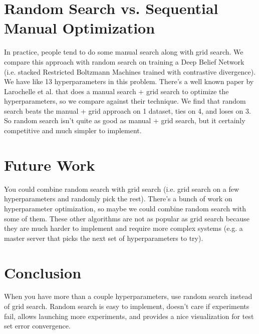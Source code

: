 \documentclass[a4paper]{article}
\begin{document}
\section{Random Search vs. Sequential Manual Optimization}
In practice, people tend to do some manual search along with grid search. We
compare this approach with random search on training a Deep Belief Network
(i.e. stacked Restricted Boltzmann Machines trained with contrastive
divergence). We have like 13 hyperparameters in this problem. There's a
well known paper by Larochelle et al. that does a manual search + grid search
to optimize the hyperparameters, so we compare against their technique. We find
that random search beats the manual + grid approach on 1 dataset, ties on 4,
and loses on 3. So random search isn't quite as good as manual + grid search,
but it certainly competitive and much simpler to implement.

\section{Future Work}
You could combine random search with grid search (i.e. grid search on a few
hyperparameters and randomly pick the rest). There's a bunch of work on
hyperparameter optimization, so maybe we could combine random search with
some of them. These other algorithms are not as popular as grid search because
they are much harder to implement and require more complex systems (e.g. a
master server that picks the next set of hyperparameters to try).

\section{Conclusion}
When you have more than a couple hyperparameters, use random search instead of
grid search. Random search is easy to implement, doesn't care if experiments
fail, allows launching more experiments, and provides a nice visualization for
test set error convergence.
\end{document}
